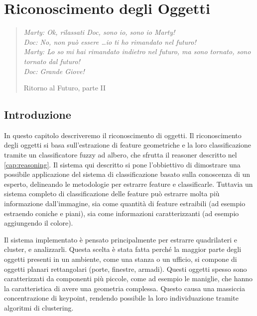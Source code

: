 \chapter{Riconoscimento degli Oggetti}
\label{cap:riconoscimento}
\thispagestyle{empty}

\begin{quotation}
{\footnotesize
\noindent\emph{Marty: Ok, rilassati Doc, sono io, sono io Marty! \\
Doc: No, non può essere \dots io ti ho rimandato nel futuro! \\
Marty: Lo so mi hai rimandato indietro nel futuro, ma sono tornato, sono tornato dal futuro! \\
Doc: Grande Giove!}
\begin{flushright}
Ritorno al Futuro, parte II
\end{flushright}
}
\end{quotation}
\vspace{0.5cm}

\section{Introduzione}

In questo capitolo descriveremo il riconoscimento di oggetti. Il riconoscimento degli oggetti si basa sull'estrazione di feature geometriche e la loro classificazione tramite un classificatore fuzzy ad albero, che sfrutta il reasoner descritto nel \autoref{cap:reasoning}.
Il sistema qui descritto si pone l'obbiettivo di dimostrare una possibile applicazione del sistema di classificazione basato sulla conoscenza di un esperto, delineando le metodologie per estrarre feature e classificarle. Tuttavia un sistema completo di classificazione delle feature può estrarre molta più informazione dall'immagine, sia come quantità di feature estraibili (ad esempio estraendo coniche e piani), sia come informazioni caratterizzanti (ad esempio aggiungendo il colore).

Il sistema implementato è pensato principalmente per estrarre quadrilateri e cluster, e analizzarli. Questa scelta è stata fatta perché la maggior parte degli oggetti presenti in un ambiente, come una stanza o un ufficio, si compone di oggetti planari rettangolari (porte, finestre, armadi). Questi oggetti spesso sono caratterizzati da componenti più piccole, come ad esempio le maniglie, che hanno la caratteristica di avere una geometria complessa. Questo causa una massiccia concentrazione di keypoint, rendendo possibile la loro individuazione tramite algoritmi di clustering.

